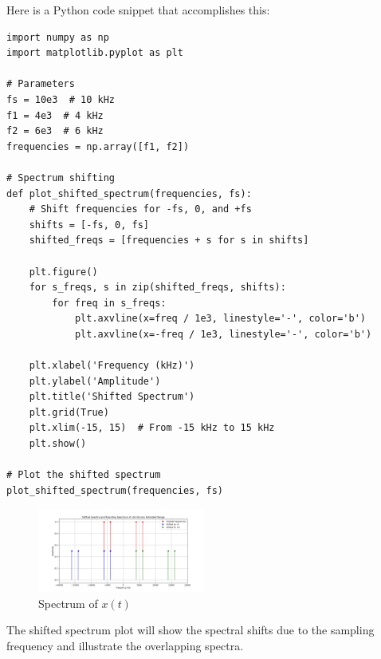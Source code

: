
\item[(b)]
Here is a Python code snippet that accomplishes this:

\begin{verbatim}
import numpy as np
import matplotlib.pyplot as plt

# Parameters
fs = 10e3  # 10 kHz
f1 = 4e3  # 4 kHz
f2 = 6e3  # 6 kHz
frequencies = np.array([f1, f2])

# Spectrum shifting
def plot_shifted_spectrum(frequencies, fs):
    # Shift frequencies for -fs, 0, and +fs
    shifts = [-fs, 0, fs]
    shifted_freqs = [frequencies + s for s in shifts]

    plt.figure()
    for s_freqs, s in zip(shifted_freqs, shifts):
        for freq in s_freqs:
            plt.axvline(x=freq / 1e3, linestyle='-', color='b')
            plt.axvline(x=-freq / 1e3, linestyle='-', color='b')

    plt.xlabel('Frequency (kHz)')
    plt.ylabel('Amplitude')
    plt.title('Shifted Spectrum')
    plt.grid(True)
    plt.xlim(-15, 15)  # From -15 kHz to 15 kHz
    plt.show()

# Plot the shifted spectrum
plot_shifted_spectrum(frequencies, fs)
\end{verbatim}

\begin{figure}[h]
    \centering
    \includegraphics[width=0.49\textwidth]{fig/ex1_b_plot}
    \caption{Spectrum of \(x(t)\)}
    \label{fig:ex1_b_plot}
\end{figure}

The shifted spectrum plot will show the spectral shifts due to the sampling frequency and illustrate the overlapping spectra.